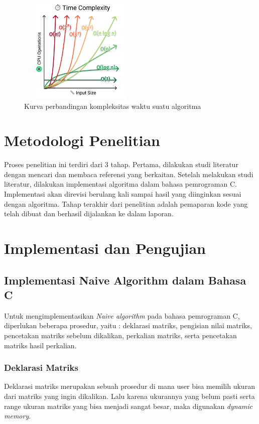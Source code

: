 \documentclass[conference]{IEEEtran}
\begin{document}
\begin{figure}[h]
   \includegraphics[width = 6cm, height = 5cm]{Kurva_Kompleksitas_Waktu.png}
   \centering
   \caption{Kurva perbandingan kompleksitas waktu suatu algoritma}
\end{figure}

\section{Metodologi Penelitian}
Proses penelitian ini terdiri dari 3 tahap.
Pertama, dilakukan studi literatur dengan mencari dan membaca referensi yang berkaitan.
Setelah melakukan studi literatur, dilakukan implementasi algoritma dalam bahasa pemrograman C.
Implementasi akan direvisi berulang kali sampai hasil yang diinginkan sesuai dengan algoritma.
Tahap terakhir dari penelitian adalah pemaparan kode yang telah dibuat dan berhasil dijalankan ke dalam laporan.


\section{Implementasi dan Pengujian}

\subsection{Implementasi Naive Algorithm dalam Bahasa C}
Untuk mengimplementasikan \textit{Naive algorithm} pada bahasa pemrograman C, diperlukan beberapa prosedur, yaitu : 
deklarasi matriks, pengisian nilai matriks, pencetakan matriks sebelum dikalikan, perkalian matriks, serta pencetakan matriks hasil perkalian. 

\subsubsection{Deklarasi Matriks}
Deklarasi matriks merupakan sebuah prosedur di mana user bisa memilih ukuran dari matriks yang ingin dikalikan. 
Lalu karena ukurannya yang belum pasti serta range ukuran matriks yang bisa menjadi sangat besar, maka digunakan \textit{dynamic memory}.
\end{document}
